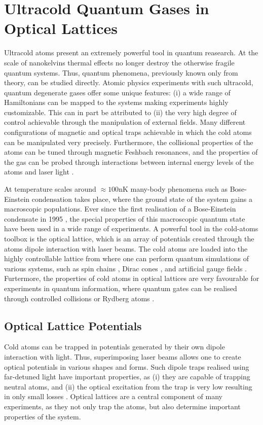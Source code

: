 \chapter{Ultracold Quantum Gases in Optical Lattices}

Ultracold atoms present an extremely powerful tool in quantum reasearch. At the scale of nanokelvins thermal effects no longer destroy the otherwise fragile quantum systems. Thus, quantum phenomena, previously known only from theory, can be studied directly. Atomic physics experiments with such ultracold, quantum degenerate gases offer some unique features: (i) a wide range of Hamiltonians can be mapped to the systems making experiments highly customizable. This can in part be attributed to (ii) the very high degree of control achievable through the manipulation of external fields. Many different configurations of magnetic and optical traps achievable in which the cold atoms can be manipulated very precisely. Furthermore, the collisional properties of the atoms can be tuned through magnetic Feshbach resonances, and the properties of the gas can be probed through interactions between internal energy levels of the atoms and laser light \cite{JakschZoller, Bloch2012}.

At temperature scales around $\approx 100 \mathrm{nK}$ many-body phenomena such as Bose-Einstein condensation takes place, where the ground state of the system gains a macroscopic populations. Ever since the first realisation of a Bose-Einstein condensate in 1995 \cite{WiemanCornell1995}, the special properties of this macroscopic quantum state have been used in a wide range of experiments. A powerful tool in the cold-atoms toolbox is the optical lattice, which is an array of potentials created through the atoms dipole interaction with laser beams. The cold atoms are loaded into the highly controllable lattice from where one can perform quantum simulations of various systems, such as spin chains \cite{Simon2011}, Dirac cones \cite{Tarruell2012}, and artificial gauge fields \cite{Dalibard2011}. Furtermore, the properties of cold atoms in optical lattices are very favourable for experiments in quantum information, where quantum gates can be realised through controlled collisions \cite{Zoller1999} or Rydberg atoms \cite{Molmer2010}.

\section{Optical Lattice Potentials}
Cold atoms can be trapped in potentials generated by their own dipole interaction with light. Thus, superimposing laser beams allows one to create optical potentials in various shapes and forms. Such dipole traps realised using far-detuned light have important properties, as (i) they are capable of trapping neutral atoms, and (ii) the optical excitation from the trap is very low resulting in only small losses \cite{grimm}. Optical lattices are a central component of many experiments, as they not only trap the atoms, but also determine important properties of the system.

